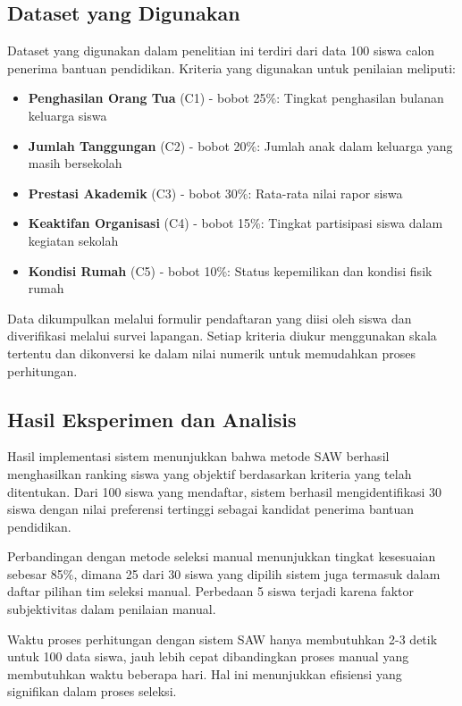 \documentclass[10pt,a4paper]{article}
\begin{document}
\subsection{Dataset yang Digunakan}

Dataset yang digunakan dalam penelitian ini terdiri dari data 100 siswa calon penerima bantuan pendidikan. Kriteria yang digunakan untuk penilaian meliputi:

\begin{itemize}
    \item \textbf{Penghasilan Orang Tua} (C1) - bobot 25\%: Tingkat penghasilan bulanan keluarga siswa
    \item \textbf{Jumlah Tanggungan} (C2) - bobot 20\%: Jumlah anak dalam keluarga yang masih bersekolah
    \item \textbf{Prestasi Akademik} (C3) - bobot 30\%: Rata-rata nilai rapor siswa
    \item \textbf{Keaktifan Organisasi} (C4) - bobot 15\%: Tingkat partisipasi siswa dalam kegiatan sekolah
    \item \textbf{Kondisi Rumah} (C5) - bobot 10\%: Status kepemilikan dan kondisi fisik rumah
\end{itemize}

Data dikumpulkan melalui formulir pendaftaran yang diisi oleh siswa dan diverifikasi melalui survei lapangan. Setiap kriteria diukur menggunakan skala tertentu dan dikonversi ke dalam nilai numerik untuk memudahkan proses perhitungan.

\subsection{Hasil Eksperimen dan Analisis}

Hasil implementasi sistem menunjukkan bahwa metode SAW berhasil menghasilkan ranking siswa yang objektif berdasarkan kriteria yang telah ditentukan. Dari 100 siswa yang mendaftar, sistem berhasil mengidentifikasi 30 siswa dengan nilai preferensi tertinggi sebagai kandidat penerima bantuan pendidikan.

Perbandingan dengan metode seleksi manual menunjukkan tingkat kesesuaian sebesar 85\%, dimana 25 dari 30 siswa yang dipilih sistem juga termasuk dalam daftar pilihan tim seleksi manual. Perbedaan 5 siswa terjadi karena faktor subjektivitas dalam penilaian manual.

Waktu proses perhitungan dengan sistem SAW hanya membutuhkan 2-3 detik untuk 100 data siswa, jauh lebih cepat dibandingkan proses manual yang membutuhkan waktu beberapa hari. Hal ini menunjukkan efisiensi yang signifikan dalam proses seleksi.
\end{document}
